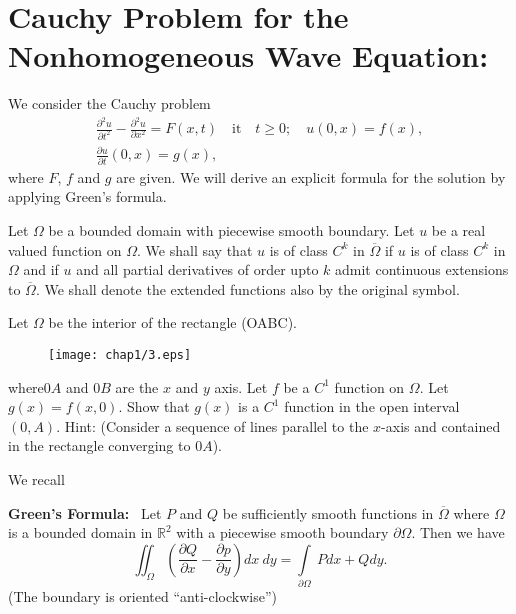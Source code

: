 \section*{Cauchy Problem for the Nonhomogeneous Wave Equation:}

We consider the Cauchy problem
\begin{gather*}
\frac{\partial^{2}u}{\partial t^{2}}-\frac{\partial^{2}u}{\partial x^{2}}=F(x,t)\quad\text{it}\quad t\geq 0;\quad u(0,x)=f(x),\\[4pt]
\frac{\partial u}{\partial t}(0,x)=g(x),
\end{gather*}
where $F$, $f$ and $g$ are given. We will derive an explicit formula for the solution by applying Green's formula.

Let $\Omega$ be a bounded domain with piecewise smooth boundary. Let $u$ be a real valued function on $\Omega$. We shall say that $u$ is of class $C^{k}$ in $\overline{\Omega}$ if $u$ is of class $C^{k}$ in $\Omega$ and if $u$ and all partial derivatives of order upto $k$ admit continuous extensions to $\overline{\Omega}$. We shall denote the extended functions also by the original symbol.

\begin{exer*}
Let $\Omega$ be the interior of the rectangle (OABC).
\begin{figure}[H]
\centering
\texttt{[image: chap1/3.eps]}
\end{figure}
\noindent
where\pageoriginale $0A$ and $0B$ are the $x$ and $y$ axis. Let $f$ be a $C^{1}$ function on $\Omega$. Let $g(x)=f(x,0)$. Show that $g(x)$ is a $C^{1}$ function in the open interval $(0,A)$. Hint: (Consider a sequence of lines parallel to the $x$-axis and contained in the rectangle converging to $0A$).
\end{exer*}

We recall

\medskip
\noindent
{\bf Green's Formula:}~ Let $P$ and $Q$ be sufficiently smooth functions in $\overline{\Omega}$ where $\Omega$ is a bounded domain in $\mathbb{R}^{2}$ with a piecewise smooth boundary $\partial \Omega$. Then we have
$$
\iint_{\Omega}\left(\frac{\partial Q}{\partial x}-\frac{\partial p}{\partial y}\right)dx \ dy =\int\limits_{\partial \Omega}\ Pdx +Qdy.
$$
(The boundary is oriented ``anti-clockwise'')

